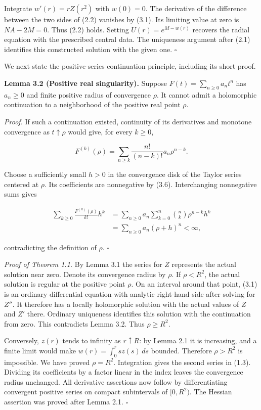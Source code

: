 \documentclass[11pt]{article}
\begin{document}
Integrate \(w'(r)=rZ(r^2)\) with \(w(0)=0\). The derivative of the
difference between the two sides of (2.2) vanishes by (3.1). Its
limiting value at zero is \(NA-2M=0\). Thus (2.2) holds. Setting
\(U(r)=e^{M-w(r)}\) recovers the radial equation with the prescribed
central data. The uniqueness argument after (2.1) identifies this
constructed solution with the given one. \(\square\)

We next state the positive-series continuation principle, including its
short proof.

\textbf{Lemma 3.2 (Positive real singularity).} Suppose
\(F(t)=\sum_{n\geq0}a_nt^n\) has \(a_n\geq0\) and finite positive radius
of convergence \(\rho\). It cannot admit a holomorphic continuation to a
neighborhood of the positive real point \(\rho\).

\emph{Proof.} If such a continuation existed, continuity of its
derivatives and monotone convergence as \(t\uparrow\rho\) would give,
for every \(k\geq0\),

\[
F^{(k)}(\rho)=\sum_{n\geq k}\frac{n!}{(n-k)!}a_n\rho^{n-k}.
\tag{3.6}
\]

Choose a sufficiently small \(h>0\) in the convergence disk of the
Taylor series centered at \(\rho\). Its coefficients are nonnegative by
(3.6). Interchanging nonnegative sums gives

\[
\begin{aligned}
\sum_{k\geq0}\frac{F^{(k)}(\rho)}{k!}h^k
&=\sum_{n\geq0}a_n\sum_{k=0}^n\binom nk\rho^{n-k}h^k\\
&=\sum_{n\geq0}a_n(\rho+h)^n<\infty,
\end{aligned}
\tag{3.7}
\]

contradicting the definition of \(\rho\). \(\square\)

\emph{Proof of Theorem 1.1.} By Lemma 3.1 the series for \(Z\)
represents the actual solution near zero. Denote its convergence radius
by \(\rho\). If \(\rho<R^2\), the actual solution is regular at the
positive point \(\rho\). On an interval around that point, (3.1) is an
ordinary differential equation with analytic right-hand side after
solving for \(Z''\). It therefore has a locally holomorphic solution
with the actual values of \(Z\) and \(Z'\) there. Ordinary uniqueness
identifies this solution with the continuation from zero. This
contradicts Lemma 3.2. Thus \(\rho\geq R^2\).

Conversely, \(z(r)\) tends to infinity as \(r\uparrow R\): by Lemma 2.1
it is increasing, and a finite limit would make
\(w(r)=\int_0^r sz(s)\,ds\) bounded. Therefore \(\rho>R^2\) is
impossible. We have proved \(\rho=R^2\). Integration gives the second
series in (1.3). Dividing its coefficients by a factor linear in the
index leaves the convergence radius unchanged. All derivative assertions
now follow by differentiating convergent positive series on compact
subintervals of \([0,R^2)\). The Hessian assertion was proved after
Lemma 2.1. \(\square\)
\end{document}
